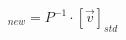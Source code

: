 \documentclass[preview]{standalone}
\begin{document}
\begin{align*}
[\vec{v}]_{new} = P^{-1} \cdot [\vec{v}]_{std}
\end{align*}
\end{document}
